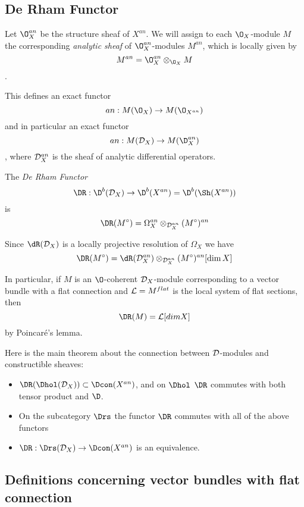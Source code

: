 \documentclass[etingof-dmod.tex]{subfiles}
\begin{document}
\subsection{De Rham Functor}
Let $\O_X^{an}$ be the structure sheaf of $X^{an}$. We will assign to each
$\O_X$-module $M$ the corresponding \textit{analytic sheaf} of
$\O_X^{an}$-modules $M^{an}$, which is locally given by
$$M^{an} = \O_{X}^{an} \otimes_{\O_X}M$$.

This defines an exact functor $$an : M(\O_X) \rightarrow
M(\O_{X^{an}})$$ and in particular an exact functor $$an: M(\mc{D}_X)
\rightarrow M(\D_X^{an})$$, where $\mathcal{D}_X^{an}$ is the sheaf of analytic
differential operators.

\begin{defn}
  The \textit{De Rham Functor}
  $$\DR: \D^b(\mc{D}_X) \rightarrow \D^b(X^{an}) = \D^b(\Sh(X^{an}))$$
  is $$\DR(M^{\circ}) = \Omega_X^{an} \otimes_{\mc{D}_X^{an}}
  (M^{\circ})^{an}$$
\end{defn}

\begin{rmk}
  Since $\dR(\mc{D}_X)$ is a locally projective resolution of $\Omega_X$ we have
  $$\DR(M^{\circ}) = \dR(\mc{D}_X^{an}) \otimes_{\mc{D}_X^{an}}
  (M^{\circ})^{an}[\dim X]$$
\end{rmk}

In particular, if $M$ is an $\O$-coherent $\mathcal{D}_X$-module corresponding to a vector
bundle with a flat connection and $\mathcal{L} = M^{flat}$ is the local system  of
flat sections, then $$\DR(M) = \mc{L}[dim X]$$ by Poincar\'e's lemma.

Here is the main theorem about the connection between $\mathcal{D}$-modules and
constructible sheaves:

\begin{thm}
  \begin{itemize}
    \item $\DR(\Dhol(\mc{D}_X)) \subset \Dcon(X^{an})$, and on $\Dhol$ $\DR$
      commutes with both tensor product and $\D$.
    \item On the subcategory $\Drs$ the functor $\DR$ commutes with all of the
      above functors
    \item $\DR: \Drs(\mc{D}_X) \rightarrow \Dcon(X^{an})$ is an equivalence.
  \end{itemize}
\end{thm}
\subsection{Definitions concerning vector bundles with flat connection}
\end{document}
